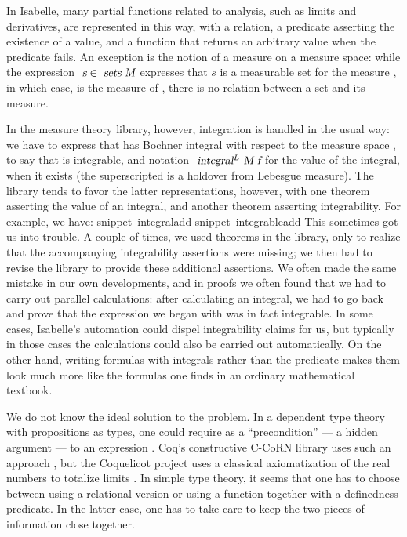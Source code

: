 \documentclass{svjour3}
\newcommand{\Snippet}[1]{\csname snippet--#1\endcsname}
\begin{document}
In Isabelle, many partial functions related to analysis, such as limits and derivatives, are represented in this way, with a relation, a predicate asserting the existence of a value, and a function that returns an arbitrary value when the predicate fails. An exception is the notion of a measure on a measure space: while the expression $\isa{s} \in \isa{sets M}$ expresses that $s$ is a measurable set for the measure , in which case,  is the measure of , there is no relation between a set and its measure.

In the measure theory library, however, integration is handled in the usual way: we have  to express that  has Bochner integral  with respect to the measure space ,  to say that  is integrable, and notation $\isa{integral$^L$ M f}$ for the value of the integral, when it exists (the superscripted  is a holdover from Lebesgue measure). The library tends to favor the latter representations, however, with one theorem asserting the value of an integral, and another theorem asserting integrability. For example, we have:
\Snippet{integraladd}
\Snippet{integrableadd}
This sometimes got us into trouble. A couple of times, we used theorems in the library, only to realize that the accompanying integrability assertions were missing; we then had to revise the library to provide these additional assertions. We often made the same mistake in our own developments, and in proofs we often found that we had to carry out parallel calculations: after calculating an integral, we had to go back and prove that the expression we began with was in fact integrable. In some cases, Isabelle's automation could dispel integrability claims for us, but typically in those cases the calculations could also be carried out automatically. On the other hand, writing formulas with integrals rather than the  predicate makes them look much more like the formulas one finds in an ordinary mathematical textbook.

We do not know the ideal solution to the problem. In a dependent type theory with propositions as types, one could require  as a ``precondition'' --- a hidden argument --- to an expression . Coq's constructive C-CoRN library uses such an approach \cite{krebbers:spitters:11}, but the Coquelicot project uses a classical axiomatization of the real numbers to totalize limits \cite{boldo:et:al:12}. In simple type theory, it seems that one has to choose between using a relational version or using a function together with a definedness predicate. In the latter case, one has to take care to keep the two pieces of information close together.
\end{document}
